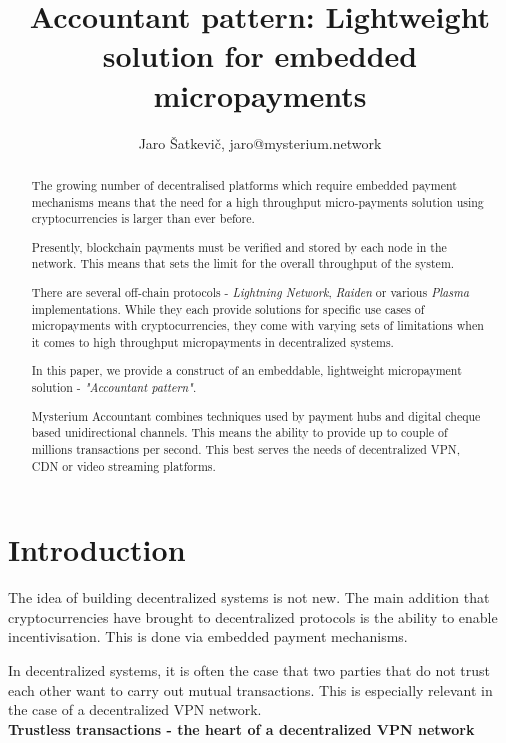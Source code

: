 \documentclass[a4paper,12pt]{article}
\title{Accountant pattern: Lightweight solution for embedded micropayments}
\author{Jaro Šatkevič, jaro@mysterium.network}
\begin{document}
\maketitle

\begin{abstract}
The growing number of decentralised platforms which require embedded payment 
mechanisms means that the need for a high throughput micro-payments solution 
using cryptocurrencies is larger than ever before. 

Presently, blockchain payments must be verified and stored by each node in the 
network. This means that sets the limit for the overall throughput of the system.

There are several off-chain protocols - \textit{Lightning Network}, \textit{Raiden}
or various \textit{Plasma} implementations. While they each provide solutions for 
specific use cases of micropayments with cryptocurrencies, they come with varying 
sets of limitations when it comes to high throughput micropayments in decentralized 
systems. 

In this paper, we provide a construct of an embeddable, lightweight micropayment 
solution - \textit{"Accountant pattern"}.

Mysterium Accountant combines techniques used by payment hubs and digital cheque 
based unidirectional channels. This means the ability to provide up to couple of
millions transactions per second. This best serves the needs of decentralized VPN, 
CDN or video streaming platforms. 
\end{abstract}


\newpage
\tableofcontents
\newpage

\section{Introduction}

The idea of building decentralized systems is not new. The main addition that 
cryptocurrencies have brought to decentralized protocols is the ability to enable 
incentivisation. This is done via embedded payment mechanisms. 

In decentralized systems, it is often the case that two parties that do not trust 
each other want to carry out mutual transactions. This is especially relevant in 
the case of a decentralized VPN network. \\

\textbf{Trustless transactions - the heart of a decentralized VPN network} \\
\end{document}
